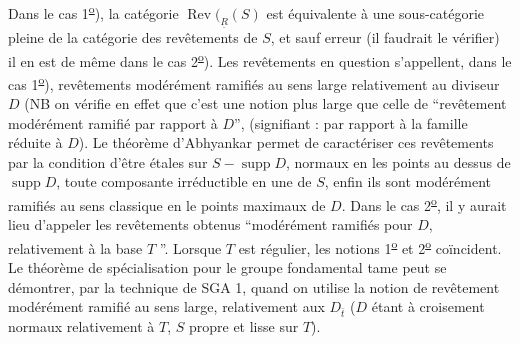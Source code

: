 Dans le cas 1\textsuperscript{\uline{o}}), la catégorie $\operatorname{Rev}(_{\underline{R}}(S)$ est équivalente à une sous-catégorie pleine de la catégorie des revêtements de $S$, et sauf erreur (il faudrait le vérifier) il en est de même dans le cas 2\textsuperscript{\uline{o}}). Les revêtements en question s'appellent, dans le cas 1\textsuperscript{\uline{o}}), revêtements modérément ramifiés au sens large relativement au diviseur $D$ (NB on vérifie en effet que c'est une notion plus large que celle de ``revêtement modérément ramifié par rapport à $D$'', (signifiant : par rapport à la famille réduite à $D$). Le théorème d'Abhyankar permet de caractériser ces revêtements par la condition d'être étales sur  $S-\operatorname{supp}D$, normaux en les points au dessus de $\operatorname{supp}D$, toute composante irréductible en  une de $S$, enfin ils sont modérément ramifiés au sens classique en le points maximaux de $D$. Dans le cas 2\textsuperscript{\uline{o}}, il y aurait lieu d'appeler les revêtements obtenus ``modérément ramifiés pour $D$, relativement à la
base $T$ ''. Lorsque $T$ est régulier, les notions 1\textsuperscript{\uline{o}} et 2\textsuperscript{\uline{o}} coïncident. Le théorème de spécialisation pour le groupe fondamental tame peut se démontrer, par la technique de SGA 1, quand on utilise la notion de revêtement modérément ramifié au sens large, relativement aux $D_{\bar{t}}$  ($D$ étant à croisement normaux relativement à $T$, $S$ propre et lisse sur $T$).

